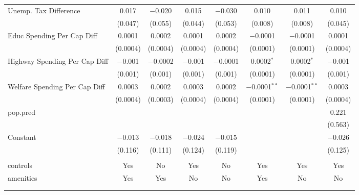 \begin{table}[!htbp]
\begin{tabular}{@{\extracolsep{5pt}}lccccccc}
  Unemp. Tax Difference & 0.017 & $-$0.020 & 0.015 & $-$0.030 & 0.010 & 0.011 & 0.010 \\ 
  & (0.047) & (0.055) & (0.044) & (0.053) & (0.008) & (0.008) & (0.045) \\ 
  Educ Spending Per Cap Diff & 0.0001 & 0.0002 & 0.0001 & 0.0002 & $-$0.0001 & $-$0.0001 & 0.0001 \\ 
  & (0.0004) & (0.0004) & (0.0004) & (0.0004) & (0.0001) & (0.0001) & (0.0004) \\ 
  Highway Spending Per Cap Diff & $-$0.001 & $-$0.0002 & $-$0.001 & $-$0.0001 & 0.0002$^{*}$ & 0.0002$^{*}$ & $-$0.001 \\ 
  & (0.001) & (0.001) & (0.001) & (0.001) & (0.0001) & (0.0001) & (0.001) \\ 
  Welfare Spending Per Cap Diff & 0.0003 & 0.0002 & 0.0003 & 0.0002 & $-$0.0001$^{**}$ & $-$0.0001$^{**}$ & 0.0003 \\ 
  & (0.0004) & (0.0003) & (0.0004) & (0.0004) & (0.0001) & (0.0001) & (0.0004) \\ 
  pop.pred &  &  &  &  &  &  & 0.221 \\ 
  &  &  &  &  &  &  & (0.563) \\ 
  Constant & $-$0.013 & $-$0.018 & $-$0.024 & $-$0.015 &  &  & $-$0.026 \\ 
  & (0.116) & (0.111) & (0.124) & (0.119) &  &  & (0.125) \\ 
 \hline \\[-1.8ex] 
controls & Yes & No & Yes & No & Yes & Yes & Yes \\ 
amenities & Yes & Yes & No & No & Yes & No & No \\ 
\hline \\[-1.8ex] 
\hline 
\hline \\[-1.8ex] 
\end{tabular} 
\end{table} 
